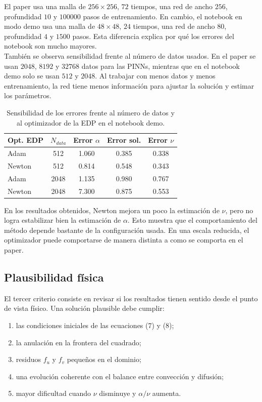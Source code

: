 \documentclass[10pt,letterpaper,twocolumn]{article}
\begin{document}
El paper usa una malla de $256\times256$, $72$ tiempos, una red de ancho $256$, profundidad $10$ y $100000$ pasos de entrenamiento. En cambio, el notebook en modo demo usa una malla de $48\times48$, $24$ tiempos, una red de ancho $80$, profundidad $4$ y $1500$ pasos. Esta diferencia explica por qué los errores del notebook son mucho mayores.\\

También se observa sensibilidad frente al número de datos usados. En el paper se usan $2048$, $8192$ y $32768$ datos para las PINNs, mientras que en el notebook demo solo se usan $512$ y $2048$. Al trabajar con menos datos y menos entrenamiento, la red tiene menos información para ajustar la solución y estimar los parámetros.

\begin{table}[H]
\centering
\scriptsize
\setlength{\tabcolsep}{3pt}
\caption{Sensibilidad de los errores frente al número de datos y al optimizador de la EDP en el notebook demo.}
\begin{tabular}{lcccc}
\toprule
Opt. EDP & $N_{data}$ & Error $\alpha$ & Error sol. & Error $\nu$ \\
\midrule
Adam   & 512  & 1.060 & 0.385 & 0.338 \\
Newton & 512  & 0.814 & 0.548 & 0.343 \\
Adam   & 2048 & 1.135 & 0.980 & 0.767 \\
Newton & 2048 & 7.300 & 0.875 & 0.553 \\
\bottomrule
\end{tabular}
\label{tab:sensibilidad-demo}
\end{table}

En los resultados obtenidos, Newton mejora un poco la estimación de $\nu$, pero no logra estabilizar bien la estimación de $\alpha$. Esto muestra que el comportamiento del método depende bastante de la configuración usada. En una escala reducida, el optimizador puede comportarse de manera distinta a como se comporta en el paper.

\subsection{Plausibilidad física}

El tercer criterio consiste en revisar si los resultados tienen sentido desde el punto de vista físico. Una solución plausible debe cumplir:

\begin{enumerate}[leftmargin=*]
\item las condiciones iniciales de las ecuaciones (7) y (8);
\item la anulación en la frontera del cuadrado;
\item residuos $f_u$ y $f_v$ pequeños en el dominio;
\item una evolución coherente con el balance entre convección y difusión;
\item mayor dificultad cuando $\nu$ disminuye y $\alpha/\nu$ aumenta.
\end{enumerate}
\end{document}
